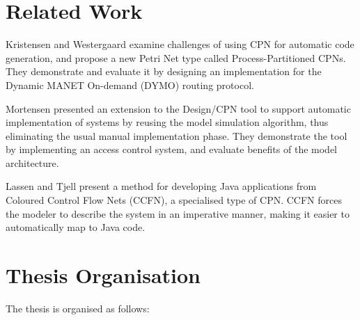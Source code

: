 \section{Related Work}

Kristensen and Westergaard \cite{kristensen2010automatic} examine challenges of
using CPN for automatic code generation, and propose a new Petri Net type called
Process-Partitioned CPNs. They demonstrate and evaluate it by
designing an implementation for the Dynamic MANET On-demand (DYMO) routing
protocol.

Mortensen \cite{mortensen2000automatic} presented an extension to the Design/CPN
tool to support automatic implementation of systems by reusing the model
simulation algorithm, thus eliminating the usual manual implementation phase.
They demonstrate the tool by implementing an access control system, and
evaluate benefits of the model architecture.

Lassen and Tjell \cite{lassen2010automatic}  present a method for developing
Java applications from Coloured Control Flow Nets (CCFN), a specialised type of
CPN. CCFN forces the modeler to describe the system in an
imperative manner, making it easier to automatically map to Java code.

\section{Thesis Organisation}
The thesis is organised as follows:

